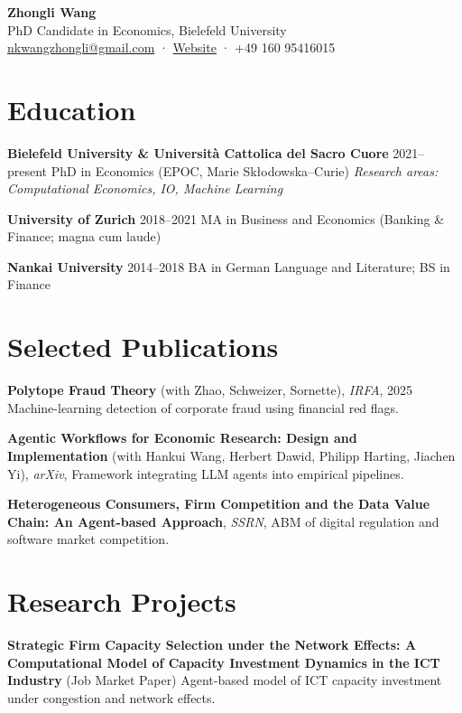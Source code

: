 \documentclass[a4paper,11pt]{article}
\begin{document}
\begin{center}
{\LARGE \textbf{Zhongli Wang}}\\[4pt]
PhD Candidate in Economics, Bielefeld University\\
\href{mailto:nkwangzhongli@gmail.com}{nkwangzhongli@gmail.com} · 
\href{https://sites.google.com/view/zhongli-wang}{Website} · 
+49 160 95416015
\end{center}

\section{Education}

\textbf{Bielefeld University \& Università Cattolica del Sacro Cuore} \hfill 2021–present  
PhD in Economics (EPOC, Marie Skłodowska–Curie)  
\emph{Research areas: Computational Economics, IO, Machine Learning}  

\textbf{University of Zurich} \hfill 2018–2021  
MA in Business and Economics (Banking \& Finance; magna cum laude)  

\textbf{Nankai University} \hfill 2014–2018  
BA in German Language and Literature; BS in Finance  


\section{Selected Publications}

\textbf{Polytope Fraud Theory} (with Zhao, Schweizer, Sornette), \emph{IRFA}, 2025  
Machine-learning detection of corporate fraud using financial red flags.

\textbf{Agentic Workflows for Economic Research: Design and Implementation} (with  Hankui Wang, Herbert Dawid, Philipp Harting, Jiachen Yi), \emph{arXiv},  
Framework integrating LLM agents into empirical pipelines.

\textbf{Heterogeneous Consumers, Firm Competition and the Data Value Chain: An Agent-based Approach}, \emph{SSRN},  
ABM of digital regulation and software market competition.

\section{Research Projects}

\textbf{Strategic Firm Capacity Selection under the Network Effects: A Computational Model of Capacity Investment Dynamics in the ICT Industry} (Job Market Paper)  
Agent-based model of ICT capacity investment under congestion and network effects.
\end{document}
